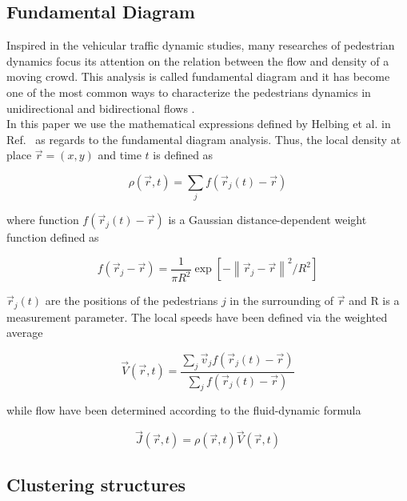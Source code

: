 \subsection{\label{fundamental-diagram} Fundamental Diagram}

Inspired in the vehicular traffic dynamic studies, many researches of pedestrian dynamics focus its attention on the relation between the flow and density of a moving crowd. This analysis is called fundamental diagram and it has become one of the most common ways to characterize the pedestrians dynamics in unidirectional and bidirectional flows \cite{fruin1,mori1,polus1,seyfried1,jelic1}. \\

In this paper we use the mathematical expressions defined by Helbing et al. in Ref.~\cite{helbing3} as regards to the fundamental diagram analysis. Thus, the local density at place $\vec{r}=(x,y)$ and time $t$ is defined as

\begin{equation}
\rho(\vec{r},t)=\sum_{j}f(\vec{r}_j(t)-\vec{r}) \label{ec-density}
\end{equation}

where function $f(\vec{r}_j(t)-\vec{r})$ is a Gaussian distance-dependent weight function defined as

\begin{equation}
f(\vec{r}_j-\vec{r})=\frac{1}{\pi R^2}\exp[-\left \| \vec{r}_j-\vec{r} \right \|^2/R^2] \label{ec-f}
\end{equation}

$\vec{r}_j(t)$ are the positions of the pedestrians $j$ in the surrounding of $\vec{r}$ and R is a measurement parameter. 
The local speeds have been defined via the weighted average  

\begin{equation}
\vec{V}(\vec{r},t)=\frac{\sum_j \vec{v}_jf(\vec{r}_j(t)-\vec{r}) }{\sum_j f(\vec{r}_j(t)-\vec{r}) } \label{ec-v}
\end{equation}

while flow have been determined according to the fluid-dynamic formula

\begin{equation}
\vec{J}(\vec{r},t)=\rho(\vec{r},t)\vec{V}(\vec{r},t) \label{ec-flow}
\end{equation}


\subsection{\label{granular-cluster} Clustering structures}

